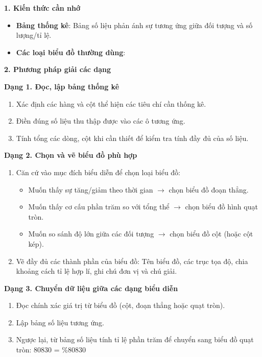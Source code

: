 \textbf{1. Kiến thức cần nhớ}
\begin{itemize}
\item \textbf{Bảng thống kê}: Bảng số liệu phản ánh sự tương ứng giữa đối tượng và số lượng/tỉ lệ.
\item \textbf{Các loại biểu đồ thường dùng}:
\end{itemize}

\textbf{2. Phương pháp giải các dạng}

\textbf{Dạng 1. Đọc, lập bảng thống kê}
\begin{enumerate}
\item Xác định các hàng và cột thể hiện các tiêu chí cần thống kê.
\item Điền đúng số liệu thu thập được vào các ô tương ứng.
\item Tính tổng các dòng, cột khi cần thiết để kiểm tra tính đầy đủ của số liệu.
\end{enumerate}

\textbf{Dạng 2. Chọn và vẽ biểu đồ phù hợp}
\begin{enumerate}
\item Căn cứ vào mục đích biểu diễn để chọn loại biểu đồ:
\begin{itemize}
\item Muốn thấy sự tăng/giảm theo thời gian $\rightarrow$ chọn biểu đồ đoạn thẳng.
\item Muốn thấy cơ cấu phần trăm so với tổng thể $\rightarrow$ chọn biểu đồ hình quạt tròn.
\item Muốn so sánh độ lớn giữa các đối tượng $\rightarrow$ chọn biểu đồ cột (hoặc cột kép).
\end{itemize}
\item Vẽ đầy đủ các thành phần của biểu đồ: Tên biểu đồ, các trục tọa độ, chia khoảng cách tỉ lệ hợp lí, ghi chú đơn vị và chú giải.
\end{enumerate}

\textbf{Dạng 3. Chuyển dữ liệu giữa các dạng biểu diễn}
\begin{enumerate}
\item Đọc chính xác giá trị từ biểu đồ (cột, đoạn thẳng hoặc quạt tròn).
\item Lập bảng số liệu tương ứng.
\item Ngược lại, từ bảng số liệu tính tỉ lệ phần trăm để chuyển sang biểu đồ quạt tròn:
80830 =  \%80830
\end{enumerate}

